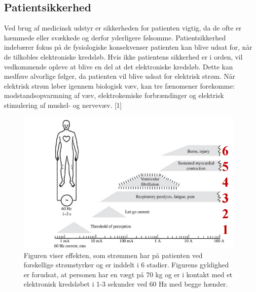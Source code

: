 \subsection{Patientsikkerhed}
Ved brug af medicinsk udstyr er sikkerheden for patienten vigtig, da de ofte er hæmmede eller svækkede og derfor yderligere følsomme. Patientsikkerhed indebærer fokus på de fysiologiske konsekvenser patienten kan blive udsat for, når de tilkobles elektroniske kredsløb. Hvis ikke patientens sikkerhed er i orden, vil vedkommende opleve at blive en del at det elektroniske kredsløb. Dette kan medføre alvorlige følger, da patienten vil blive udsat for elektrisk strøm. Når elektrisk strøm løber igennem biologisk væv, kan tre fænomener forekomme: modstandsopvarmning af væv, elektrokemiske forbrændinger og elektrisk stimulering af muskel- og nervevæv. [1] 
\begin{figure}[H]
	\centering
	\includegraphics[scale=0.8]{figures/bProblemanalyse/Patientsikkerhed.png}
	\caption{Figuren viser effekten, som strømmen har på patienten ved forskellige strømstyrker og er inddelt i 6 stadier. Figurens gyldighed er forudsat, at personen har en vægt på 70 kg og er i kontakt med et elektronisk kredsløbet i 1-3 sekunder ved 60 Hz med begge hænder.}
	\label{Patientsikkerhed}
\end{figure}

